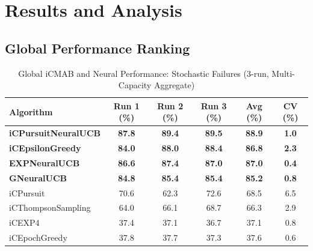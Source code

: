 \documentclass[12pt,a4paper]{article}
\newcommand{\primarytext}[1]{\textcolor{primaryblue}{\textbf{#1}}}
\newcommand{\legacy}[1]{\textcolor{legacycolor}{\textbf{#1}}}
\newcommand{\neural}[1]{\textcolor{neuralcolor}{\textbf{#1}}}
\begin{document}
\newpage
\section{Results and Analysis}

\begin{tcolorbox}[colback=tableheader,colframe=primaryblue,title=\textbf{Primary iCMAB Performance Results (Stochastic Environment, Attack Rate: 0.25)}]

\subsection{Global Performance Ranking}

\begin{table}[H]
\footnotesize
\centering
\caption{Global iCMAB and Neural Performance: Stochastic Failures (3-run, Multi-Capacity Aggregate)}
\label{tab:global-performance-stochastic}
\begin{tabular}{@{}lccccc@{}}\toprule
\textbf{Algorithm} & \textbf{Run 1 (\%)} & \textbf{Run 2 (\%)} & \textbf{Run 3 (\%)} & \textbf{Avg (\%)} & \textbf{CV (\%)} \\\midrule
\neural{iCPursuitNeuralUCB}   & \neural{87.8} & \neural{89.4} & \neural{89.5} & \neural{88.9} & \neural{1.0} \\
\primarytext{iCEpsilonGreedy}   & \primarytext{84.0} & \primarytext{88.0} & \primarytext{88.4} & \primarytext{86.8} & \primarytext{2.3} \\
\legacy{EXPNeuralUCB}           & \legacy{86.6} & \legacy{87.4} & \legacy{87.0} & \legacy{87.0} & \legacy{0.4} \\
\neural{GNeuralUCB}            & \neural{84.8} & \neural{85.4} & \neural{85.4} & \neural{85.2} & \neural{0.8} \\
iCPursuit                       & 70.6 & 62.3 & 72.6 & 68.5 & 6.5 \\
iCThompsonSampling              & 64.0 & 66.1 & 68.7 & 66.3 & 2.9 \\
iCEXP4                          & 37.4 & 37.1 & 36.7 & 37.1 & 0.8 \\
iCEpochGreedy                   & 37.8 & 37.7 & 37.3 & 37.6 & 0.6 \\\bottomrule
\end{tabular}
\end{table}


\end{tcolorbox}
\end{document}
